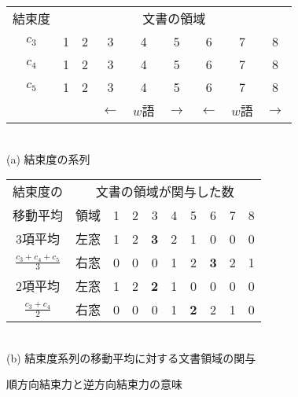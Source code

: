\begin{figure}[htbp]
  \begin{center}
    \leavevmode
    \begin{tabular}{ccccccccc}
      
      結束度 &  \multicolumn{8}{c}{文書の領域} \\
      \cline{2-7}
      $c_3$  & \multicolumn{1}{|c}{1} & 2 & \multicolumn{1}{c|}{3}
      & 4 & 5 & \multicolumn{1}{c|}{6} & 7 & 8 \\
      \cline{2-8}
      $c_4$  & 1 & \multicolumn{1}{|c}{2} & 3 &  \multicolumn{1}{c|}{4} 
      & 5 & 6 & \multicolumn{1}{c|}{7} & 8 \\
      \cline{3-9}
      $c_5$   & 1 & 2 & \multicolumn{1}{|c}{3} & 4 &  \multicolumn{1}{c|}{5} 
      & 6 & 7 & \multicolumn{1}{c|}{8} \\
      \cline{4-9}
      \multicolumn{3}{c}{}
            & \multicolumn{1}{l}{$\leftarrow$}
            & \multicolumn{1}{c}{$w$語}
            & \multicolumn{1}{r}{$\rightarrow$}
            & \multicolumn{1}{l}{$\leftarrow$}
            & \multicolumn{1}{c}{$w$語}
            & \multicolumn{1}{r}{$\rightarrow$} \\
    \end{tabular}\\
    (a) 結束度の系列\\
    \medskip{}
    \begin{tabular}{|c|c|c|c|c|c|c|c|c|c|}
      \hline
      \multicolumn{1}{|c|}{結束度の}  & \multicolumn{9}{|c|}{文書の領域が関与した数} \\
      \cline{2-10}
      \multicolumn{1}{|c|}{移動平均}  & \multicolumn{1}{c|}{領域} & 1 & 2 & 3 & 4 & 5 & 6 & 7 & 8 \\
      \hline
      3項平均
      & 左窓 & 1 & 2 & {\bf 3} & 2 & 1 & 0 & 0 & 0 \\
      \cline{2-10}
      $\frac{c_3+c_4+c_5}{3}$
      & 右窓 & 0 & 0 & 0 & 1 & 2 & {\bf 3} & 2 & 1 \\
      \hline
      2項平均
      & 左窓 & 1 & 2 & {\bf 2} & 1 & 0 & 0 & 0 & 0 \\
      \cline{2-10}
      $\frac{c_3+c_4}{2}$
      & 右窓 & 0 & 0 & 0 & 1 & {\bf 2} & 2 & 1 & 0 \\
      \hline
    \end{tabular}\\
    \medskip{}
    (b)  結束度系列の移動平均に対する文書領域の関与\\
    \medskip{}
    \caption{順方向結束力と逆方向結束力の意味}
    \label{fig:移動平均と結束力}
  \end{center}
\end{figure}

